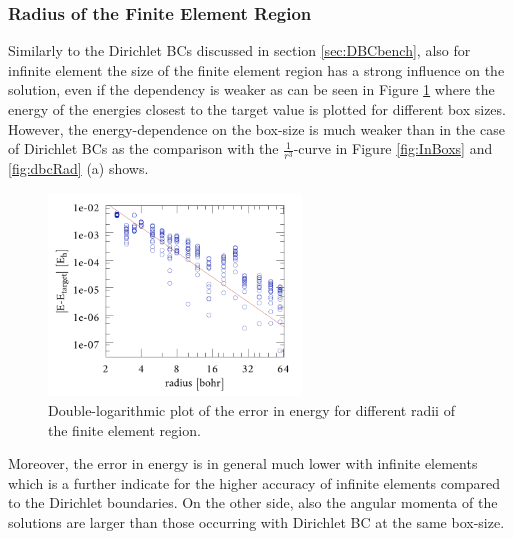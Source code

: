\subsubsection{Radius of the Finite Element Region}
\label{ch:bmSize}
Similarly to the Dirichlet BCs discussed in section \ref{sec:DBCbench}, also for infinite element the size of the finite element region has a strong influence on the solution, even if the dependency is weaker as can be seen in Figure \ref{fig:InfBoxs} where the energy of the energies closest to the target value is plotted for different box sizes.
However, the energy-dependence on the box-size is much weaker than in the case of Dirichlet BCs as the comparison with the $\frac{1}{r^3}$-curve in Figure \ref{fig:InBoxs} and \ref{fig:dbcRad} (a) shows.
\begin{figure}
\includegraphics[width=0.6\textwidth]{Figures/BC/BoxsInfEL}
\caption{Double-logarithmic plot of the error in energy for different radii of the finite element region.}
\label{fig:InfBoxs}
\end{figure}
Moreover, the error in energy is in general much lower with infinite elements which is a further indicate for the higher accuracy of infinite elements compared to the Dirichlet boundaries.
On the other side, also the angular momenta of the solutions are larger than those occurring with Dirichlet BC at the same box-size.
